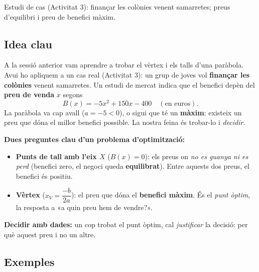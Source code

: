 %
{Estudi de cas (Activitat 3): finançar les colònies venent samarretes; preus d'equilibri i preu de benefici màxim.}

\subsection{Idea clau}

A la sessió anterior vam aprendre a trobar el vèrtex i els talls d'una paràbola.
Avui ho apliquem a un cas real (Activitat 3): un grup de joves vol \textbf{finançar
les colònies} venent samarretes. Un estudi de mercat indica que el benefici depèn
del \textbf{preu de venda} $x$ segons
\[
B(x)=-5x^2+150x-400 \quad(\text{en euros}).
\]
La paràbola va cap avall ($a=-5<0$), o sigui que té un \textbf{màxim}: existeix un
preu que dóna el millor benefici possible. La nostra feina és trobar-lo i \emph{decidir}.

\begin{idea}
\textbf{Dues preguntes clau d'un problema d'optimització:}
\begin{itemize}[leftmargin=1.4em, itemsep=2pt]
  \item \textbf{Punts de tall amb l'eix $X$} ($B(x)=0$): els preus on \emph{no es
        guanya ni es perd} (benefici zero, el negoci queda \textbf{equilibrat}).
        Entre aquests dos preus, el benefici és positiu.
  \item \textbf{Vèrtex} ($x_V=\dfrac{-b}{2a}$): el preu que dóna el \textbf{benefici
        màxim}. És el \emph{punt òptim}, la resposta a «a quin preu hem de vendre?».
  \end{itemize}
\textbf{Decidir amb dades:} un cop trobat el punt òptim, cal \emph{justificar} la
decisió: per què aquest preu i no un altre.
\end{idea}

\subsection{Exemples}

